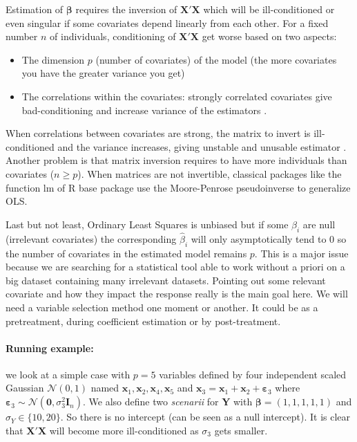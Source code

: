 \documentclass[12pt,a4paper]{report}
\begin{document}
	Estimation of $\boldsymbol{\beta}$ requires the inversion of $\boldsymbol{X}'\boldsymbol{X}$ which will be ill-conditioned or even singular if some covariates depend linearly from each other. 
For a fixed number $n$ of individuals, conditioning of $\boldsymbol{X}'\boldsymbol{X}$ get worse based on two aspects: 
\begin{itemize}
	\item The dimension $p$ (number of covariates) of the model (the more covariates you have the greater variance you get)
	\item The correlations within the covariates: strongly correlated covariates give bad-conditioning and increase variance of the estimators .
\end{itemize}
	When correlations between covariates are strong, the matrix to invert is ill-conditioned and the variance increases, giving unstable and unusable estimator \cite{hoerl1970ridge}.
	Another problem is that matrix inversion requires to have more individuals than covariates ($n\geq p$).
	When matrices are not invertible, classical packages like the function lm of R base package \cite{packagebase} use the Moore-Penrose pseudoinverse \cite{PSP:2043984} to generalize OLS.
		
		
	Last but not least, Ordinary Least Squares is unbiased but if some $\beta_i$ are null (irrelevant covariates) the corresponding $\hat{\beta}_i$ will only asymptotically tend to 0 so the number of covariates in the estimated model remains $p$. This is a major issue because we are searching for a statistical tool able to work without a priori on a big dataset containing many irrelevant datasets. Pointing out some relevant covariate and how they impact the response really is the main goal here. We will need a variable selection method one moment or another. It could be as a pretreatment, during coefficient estimation or by post-treatment. \\
	
		

	
\paragraph{Running example:} we look at a simple case with $p=5$ variables defined by four independent scaled Gaussian $\mathcal{N}(0,1)$ named $\boldsymbol{x}_1,\boldsymbol{x}_2,\boldsymbol{x}_4,\boldsymbol{x}_5$ and $\boldsymbol{x}_3=\boldsymbol{x}_1+\boldsymbol{x}_2+\boldsymbol{\varepsilon}_3$ where $\boldsymbol{\varepsilon}_3\sim{\mathcal{N}(\boldsymbol{0},\sigma_3^2\boldsymbol{I}_n)}$. We also define two {\it scenarii} for $\boldsymbol{Y}$ with $\boldsymbol{\beta}=(1,1,1,1,1)$ and $\sigma_Y \in \{10,20\}$. So there is no intercept (can be seen as a null intercept).
It is clear that $\boldsymbol{X}'\boldsymbol{X}$ will become more ill-conditioned as $\sigma_3$ gets smaller.
	
\end{document}
